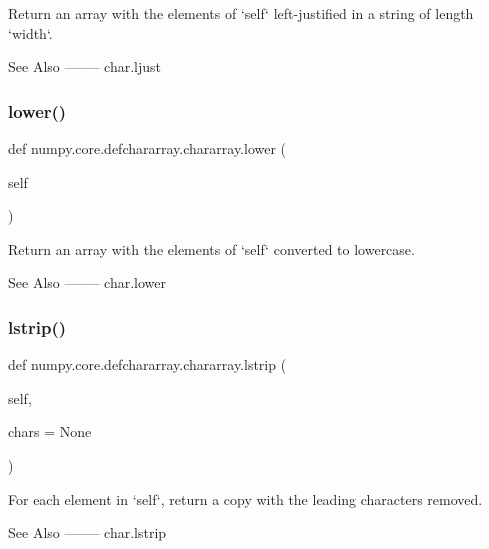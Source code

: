 \begin{DoxyVerb}Return an array with the elements of `self` left-justified in a
string of length `width`.

See Also
--------
char.ljust\end{DoxyVerb}
 \mbox{\label{classnumpy_1_1core_1_1defchararray_1_1chararray_a3378c7342f79649daf5d722451867a0c}} 
\subsubsection{\texorpdfstring{lower()}{lower()}}
{\footnotesize\ttfamily def numpy.\+core.\+defchararray.\+chararray.\+lower (\begin{DoxyParamCaption}\item[{}]{self }\end{DoxyParamCaption})}

\begin{DoxyVerb}Return an array with the elements of `self` converted to
lowercase.

See Also
--------
char.lower\end{DoxyVerb}
 \mbox{\label{classnumpy_1_1core_1_1defchararray_1_1chararray_a3bb99f7adfcadf1448b1c3c4fb65782f}} 
\subsubsection{\texorpdfstring{lstrip()}{lstrip()}}
{\footnotesize\ttfamily def numpy.\+core.\+defchararray.\+chararray.\+lstrip (\begin{DoxyParamCaption}\item[{}]{self,  }\item[{}]{chars = {\ttfamily None} }\end{DoxyParamCaption})}

\begin{DoxyVerb}For each element in `self`, return a copy with the leading characters
removed.

See Also
--------
char.lstrip\end{DoxyVerb}
 \mbox{\label{classnumpy_1_1core_1_1defchararray_1_1chararray_a3c2a6ecc52e4c77623cf43a1fb5c6334}} 
